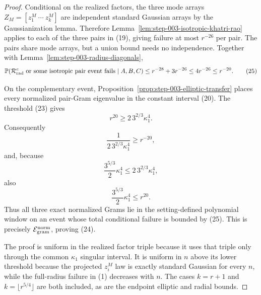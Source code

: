 \begin{proof}
Conditional on the realized factors, the three
mode arrays \(Z_M=[z_1^M\ \cdots\ z_k^M]\) are independent standard
Gaussian arrays by the Gaussianization lemma. Therefore
Lemma~\ref{lem:step-003-isotropic-khatri-rao} applies to each of the three
pairs in (19), giving failure at most \(r^{-26}\) per pair. The pairs share
mode arrays, but a union bound needs no independence. Together with
Lemma~\ref{lem:step-003-radius-diagonals},
\[
  \mathbb P\!\left(
    \mathcal R_{\rm rad}^c
    \ \text{or some isotropic pair event fails}
    \mid A,B,C
  \right)
  \le r^{-28}+3r^{-26}
  \le4r^{-26}
  \le r^{-20}.                                             \tag{25}
\]

On the complementary event, Proposition~\ref{prop:step-003-elliptic-transfer}
places every normalized pair-Gram eigenvalue in the constant interval (20).
The threshold (23) gives
\[
  r^{20}\ge2\,3^{2/3}\kappa_1^4.                          \tag{26}
\]
Consequently
\[
  \frac1{2\,3^{2/3}\kappa_1^4}\ge r^{-20},               \tag{27}
\]
and, because
\[
  \frac{3^{5/3}}2\kappa_1^4
  \le2\,3^{2/3}\kappa_1^4,
\]
also
\[
  \frac{3^{5/3}}2\kappa_1^4\le r^{20}.                   \tag{28}
\]
Thus all three exact normalized Grams lie in the setting-defined polynomial
window on an event whose total conditional failure is bounded by (25). This
is precisely \(\mathcal E_{\rm gram}^{\rm norm}\), proving (24).

The proof is uniform in the realized factor triple because it uses that triple
only through the common \(\kappa_1\) singular interval. It is uniform in
\(n\) above its lower threshold because the projected \(z_i^M\) law is exactly
standard Gaussian for every \(n\), while the full-radius failure in (1)
decreases with \(n\). The cases \(k=r+1\) and
\(k=\lfloor r^{5/4}\rfloor\) are both included, as are the endpoint elliptic
and radial bounds. 

\end{proof}

